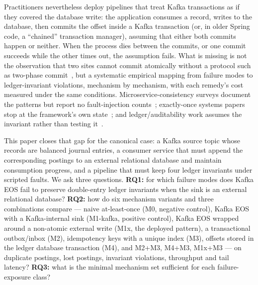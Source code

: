 Practitioners nevertheless deploy pipelines that treat Kafka transactions as if they covered the
database write: the application consumes a record, writes to the database, then commits the
offset inside a Kafka transaction (or, in older Spring code, a ``chained'' transaction manager),
assuming that either both commits happen or neither. When the process dies between the commits,
or one commit succeeds while the other times out, the assumption fails. What is missing is not
the observation that two sites cannot commit atomically without a protocol such as two-phase
commit~\cite{txncommit2006,pg-prepare}, but a systematic empirical mapping from failure modes to
ledger-invariant violations, mechanism by mechanism, with each remedy's cost measured under the
same conditions. Microservice-consistency surveys document the patterns but report no
fault-injection counts~\cite{laigner2021,micro2026}; exactly-once systems papers stop at the
framework's own state~\cite{flink2017,millwheel2013,dstreams2013}; and ledger/auditability work
assumes the invariant rather than testing it~\cite{triple2019,triple2021}.

This paper closes that gap for the canonical case: a Kafka source topic whose records are
balanced journal entries, a consumer service that must append the corresponding postings to an
external relational database and maintain consumption progress, and a pipeline that must keep
four ledger invariants under scripted faults. We ask three questions. \textbf{RQ1:} for which
failure modes does Kafka EOS fail to preserve double-entry ledger invariants when the sink is an
external relational database? \textbf{RQ2:} how do six mechanism variants and three combinations
compare --- naive at-least-once (M0, negative control), Kafka EOS with a Kafka-internal sink
(M1-kafka, positive control), Kafka EOS wrapped around a non-atomic external write (M1x, the
deployed pattern), a transactional outbox/inbox (M2), idempotency keys with a unique index (M3),
offsets stored in the ledger database transaction (M4), and M2+M3, M4+M3, M1x+M3 --- on
duplicate postings, lost postings, invariant violations, throughput and tail latency?
\textbf{RQ3:} what is the minimal mechanism set sufficient for each failure-exposure class?

